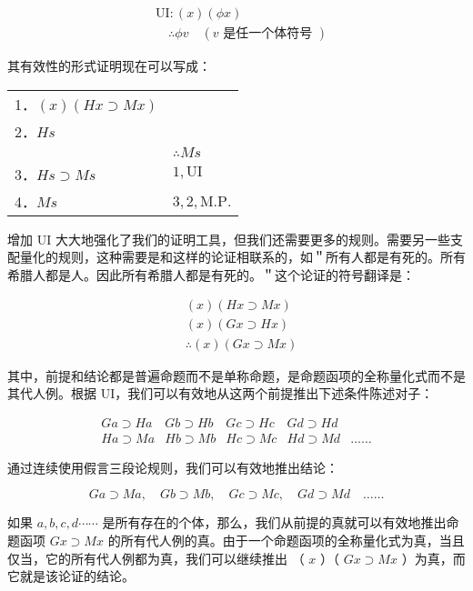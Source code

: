 $$
\begin{aligned}
& \mathrm{UI}:(x)(\phi x) \\
& \quad \therefore \phi v \quad(v \text { 是任一个体符号 })
\end{aligned}
$$

其有效性的形式证明现在可以写成：

\begin{center}
\begin{tabular}{ll}
1．$(x)(H x \supset M x)$ &  \\
2．$H s$ &  \\
 & $\therefore M s$ \\
3．$H s \supset M s$ & $1, \mathrm{UI}$ \\
4．$M s$ & $3,2, \mathrm{M} . \mathrm{P}$. \\
\end{tabular}
\end{center}

增加 UI 大大地强化了我们的证明工具，但我们还需要更多的规则。需要另一些支配量化的规则，这种需要是和这样的论证相联系的，如＂所有人都是有死的。所有希腊人都是人。因此所有希腊人都是有死的。＂这个论证的符号翻译是：

$$
\begin{aligned}
& (x)(H x \supset M x) \\
& (x)(G x \supset H x) \\
& \therefore(x)(G x \supset M x)
\end{aligned}
$$

其中，前提和结论都是普遍命题而不是单称命题，是命题函项的全称量化式而不是其代人例。根据 UI，我们可以有效地从这两个前提推出下述条件陈述对子：

$$
\begin{array}{lllll}
G a \supset H a & G b \supset H b & G c \supset H c & G d \supset H d & \\
H a \supset M a & H b \supset M b & H c \supset M c & H d \supset M d & \ldots \ldots
\end{array}
$$

通过连续使用假言三段论规则，我们可以有效地推出结论：

$$
G a \supset M a, \quad G b \supset M b, \quad G c \supset M c, \quad G d \supset M d \quad \ldots \ldots
$$

如果 $a, b, c, d \cdots \cdots$ 是所有存在的个体，那么，我们从前提的真就可以有效地推出命题函项 $G x \supset M x$ 的所有代人例的真。由于一个命题函项的全称量化式为真，当且仅当，它的所有代人例都为真，我们可以继续推出 （ $x$ ）（ $G x \supset M x$ ）为真，而它就是该论证的结论。

